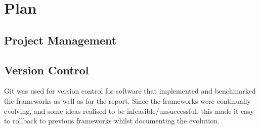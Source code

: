 \chapter{Plan}
\label{chapter3}
\section{Project Management}
\section{Version Control}
Git was used for version control for software that implemented and benchmarked the frameworks as well as for the report. Since the frameworks were continually evolving, and some ideas realised to be infeasible/unsuccessful, this made it easy to rollback to previous frameworks whilst documenting the evolution.
